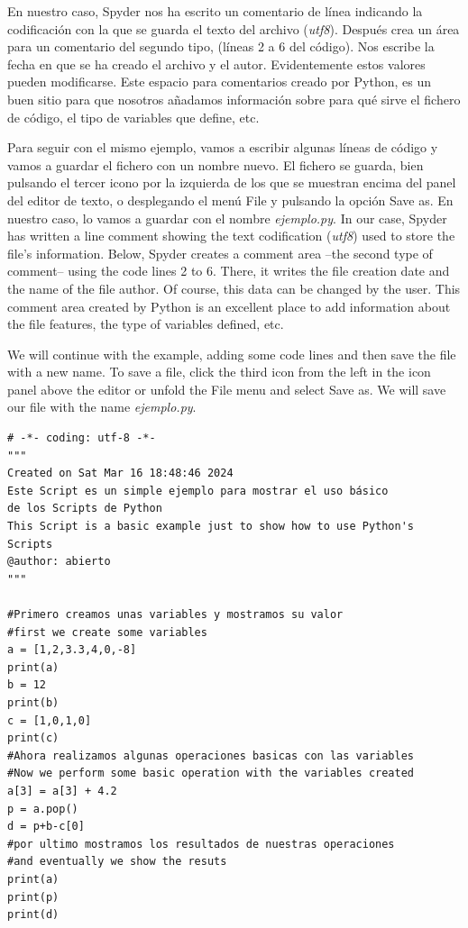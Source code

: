 \begin{paracol}{2}
En nuestro caso, Spyder nos ha escrito un comentario de línea indicando la codificación con la que se guarda el texto del archivo (\emph{utf8}). Después crea un área para un comentario del segundo tipo, (líneas 2  a 6 del código). Nos escribe la fecha en que se ha creado el archivo y el autor. Evidentemente estos valores pueden modificarse. Este espacio para comentarios creado por Python, es un buen sitio para que nosotros añadamos información sobre para qué sirve el fichero de código, el tipo de variables que define, etc.

Para seguir con el mismo ejemplo, vamos a escribir algunas líneas de código y vamos a guardar el fichero con un nombre nuevo. El fichero se guarda, bien pulsando el tercer icono por la izquierda de los que se muestran encima del panel del editor de texto, o desplegando el menú File y pulsando la opción Save as. En nuestro caso, lo vamos a guardar con el nombre \emph{ejemplo.py}.
\switchcolumn
In our case, Spyder has written a line comment showing the text codification (\emph{utf8}) used to store the file's information. Below, Spyder creates a comment area --the second type of comment-- using the code lines 2 to 6. There, it writes the file creation date and the name of the file author. Of course, this data can be changed by the user. This comment area created by Python is an excellent place to add information about the file features, the type of variables defined, etc.

We will continue with the example, adding some code lines and then save the file with a new name. To save a file, click the third icon from the left in the icon panel above the editor or unfold the File menu and select Save as. We will save our file with the name \emph{ejemplo.py}.
\end{paracol}

\begin{verbatim}
# -*- coding: utf-8 -*-
"""
Created on Sat Mar 16 18:48:46 2024
Este Script es un simple ejemplo para mostrar el uso básico
de los Scripts de Python
This Script is a basic example just to show how to use Python's
Scripts
@author: abierto 
"""

#Primero creamos unas variables y mostramos su valor
#first we create some variables
a = [1,2,3.3,4,0,-8]
print(a)
b = 12
print(b)
c = [1,0,1,0]
print(c)
#Ahora realizamos algunas operaciones basicas con las variables
#Now we perform some basic operation with the variables created
a[3] = a[3] + 4.2
p = a.pop()
d = p+b-c[0]
#por ultimo mostramos los resultados de nuestras operaciones
#and eventually we show the resuts 
print(a)
print(p)
print(d)
\end{verbatim}

